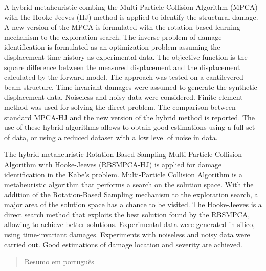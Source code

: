 \begin{resumo}

\hypertarget{estilo:resumo}{}

A hybrid metaheuristic combing the Multi-Particle Collision Algorithm (MPCA) with the Hooke-Jeeves (HJ) method is applied to identify the structural damage. A new version of the MPCA is formulated with the rotation-based learning mechanism to the exploration search. The inverse problem of damage identification is formulated as an optimization problem assuming the displacement time history as experimental data. The objective function is the square difference between the measured displacement and the displacement calculated by the forward model. The approach was tested on a cantilevered beam structure. Time-invariant damages were assumed to generate the synthetic displacement data. Noiseless and noisy data were considered. Finite element method was used for solving the direct problem.  The comparison between standard MPCA-HJ and the new version of the hybrid method is reported. The use of these hybrid algorithms allows to obtain good estimations using a full set of data, or using a reduced dataset with a low level of noise in data.


The hybrid metaheuristic Rotation-Based Sampling Multi-Particle Collision Algorithm with Hooke-Jeeves (RBSMPCA-HJ) is applied for damage identification in the Kabe's problem. Multi-Particle Collision Algorithm is a metaheuristic algorithm that performs a search on the solution space. With the addition of the Rotation-Based Sampling mechanism to the exploration search, a major area of the solution space has a chance to be visited. The Hooke-Jeeves is a direct search method that exploits the best solution found by the RBSMPCA, allowing to achieve better solutions. Experimental data were generated in silico, using time-invariant damages. Experiments with noiseless and noisy data were carried out. Good estimations of damage location and severity are achieved.

 
\end{resumo}

\begin{abstract}


\hypertarget{estilo:abstract}{}

Resumo em português



\end{abstract}